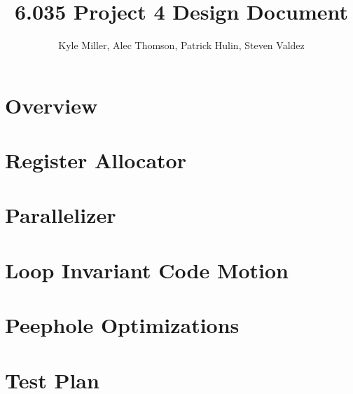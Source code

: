 \documentclass[11pt]{article}
\title{6.035 Project 4 Design Document}
\author{Kyle Miller, Alec Thomson, Patrick Hulin, Steven Valdez}
\begin{document}
\maketitle

\section {Overview} 

\section {Register Allocator}

\section {Parallelizer}

\section {Loop Invariant Code Motion}

\section {Peephole Optimizations}

\section {Test Plan}
\end{document}
